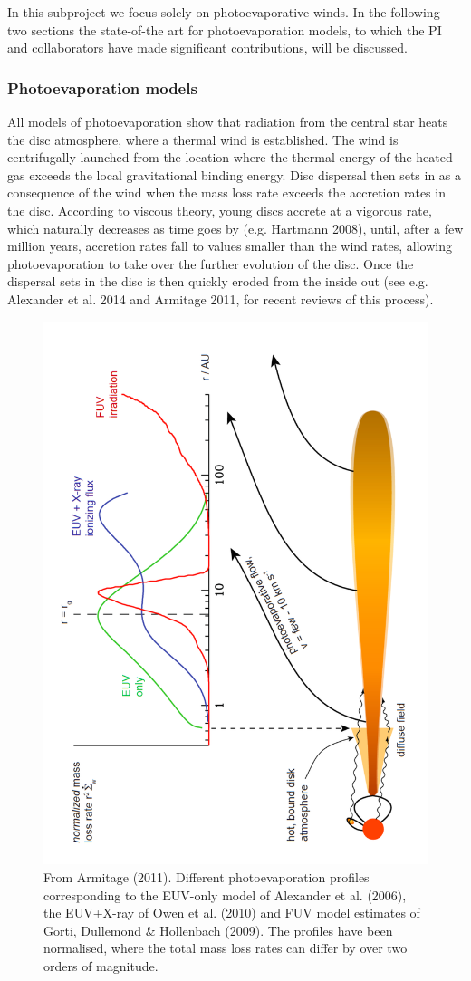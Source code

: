 \documentclass[10pt,fleqn,twoside]{article}
\begin{document}
In this subproject we focus solely on photoevaporative winds.
In the following two sections the state-of-the art for photoevaporation
models, to which the PI and collaborators have made significant contributions, will be discussed.
 
\subsubsection{Photoevaporation models} 

All models of photoevaporation show that radiation from the central
star heats the disc atmosphere, where a thermal  wind is established.
The wind is centrifugally launched from the location where the thermal
energy of the heated gas exceeds the local gravitational binding
energy. 
Disc dispersal then sets in as a consequence of the wind when the mass
loss rate exceeds the accretion rates in the disc. According to
viscous theory, young discs accrete
at a vigorous rate, which naturally decreases as time goes by
(e.g. Hartmann 2008), until,
after a few million years, accretion rates fall to values smaller than
the wind rates, allowing photoevaporation to take over the further
evolution of the disc. Once the dispersal sets in the disc is then
quickly eroded from the inside out (see e.g. Alexander et al. 2014 and
Armitage 2011, for recent reviews of this process).  


\begin{figure}
  \includegraphics[width=0.75\linewidth, angle = 270]{profiles.pdf}
  \caption{From Armitage (2011). Different photoevaporation profiles
    corresponding to the EUV-only model of Alexander et al. (2006),
    the EUV+X-ray of Owen et al. (2010) and FUV model estimates of
    Gorti, Dullemond \& Hollenbach (2009). The profiles have been
    normalised, where the total mass loss rates can differ by over two
    orders of magnitude. }
  \label{fig:profiles}
\end{figure}
\end{document}
